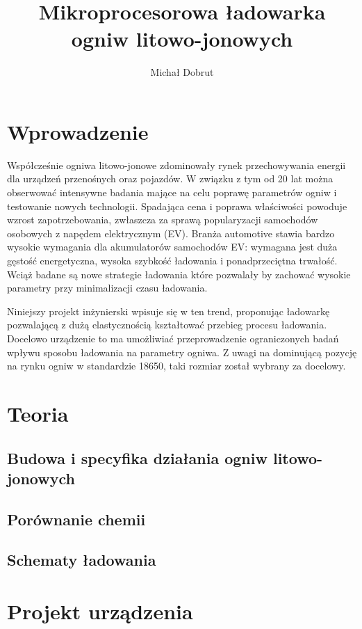 \documentclass[polish,engineer]{polsl-msth}
\author{Michał Dobrut}
\title{Mikroprocesorowa ładowarka ogniw litowo-jonowych}
\begin{document}
\frontmatter
\maketitle
\makestatement
\tableofcontents
\listoftables
\listoffigures
\mainmatter

\chapter{Wprowadzenie}

Współcześnie ogniwa litowo-jonowe zdominowały rynek przechowywania energii dla urządzeń przenośnych oraz pojazdów. W związku z tym od 20 lat można obserwować intensywne badania mające na celu poprawę parametrów ogniw i testowanie nowych technologii. Spadająca cena i poprawa właściwości powoduje wzrost zapotrzebowania, zwłaszcza za sprawą popularyzacji samochodów osobowych z napędem elektrycznym (EV). Branża automotive stawia bardzo wysokie wymagania dla akumulatorów samochodów EV: wymagana jest duża gęstość energetyczna, wysoka szybkość ładowania i ponadprzeciętna trwałość. Wciąż badane są nowe strategie ładowania które pozwalały by zachować wysokie parametry przy minimalizacji czasu ładowania.

Niniejszy projekt inżynierski wpisuje się w ten trend, proponując ładowarkę pozwalającą z dużą elastycznością kształtować przebieg procesu ładowania. Docelowo urządzenie to ma umożliwiać przeprowadzenie ograniczonych badań wpływu sposobu ładowania na parametry ogniwa. Z uwagi na dominującą pozycję na rynku ogniw w standardzie 18650, taki rozmiar został wybrany za docelowy. 


\chapter{Teoria}
\section{Budowa i specyfika działania ogniw litowo-jonowych}
\section{Porównanie chemii}
\section{Schematy ładowania}

\chapter{Projekt urządzenia}
\end{document}
